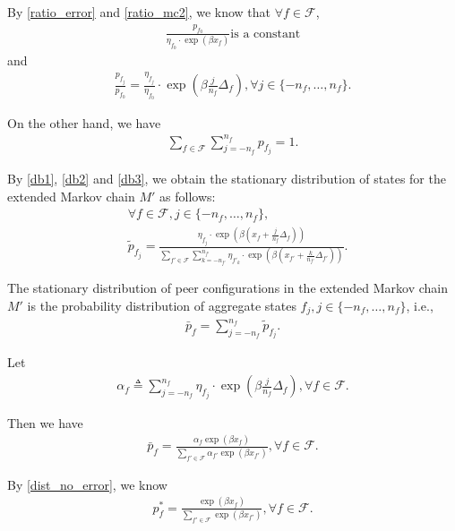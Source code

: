 \documentclass[10pt,conference]{IEEEtran}
\begin{document}
By \eqref{ratio_error} and \eqref{ratio_mc2}, we know that $ \forall
f \in \mathcal{F}$,
\begin{align}
\label{db1} \frac{p_{f_0}}{\eta_{f_0} \cdot \exp(\beta x_f)} \text{
 is a constant}
\end{align}
and
\begin{align}
\label{db2} \frac{p_{f_j}}{p_{f_0}}=\frac{\eta_{f_j}}{\eta_{f_0}}
\cdot \exp(\beta \frac{j}{n_{f}} \Delta_{f}), \forall j \in
\{-n_{f},\ldots,n_{f}\}.
\end{align}

On the other hand, we have
\begin{align}
\label{db3} \sum\limits_{f \in \mathcal{F}} {\sum\limits_{j = - n_f
}^{n_f} {p_{f_j} } }  = 1.
\end{align}

By \eqref{db1}, \eqref{db2} and \eqref{db3}, we obtain the
stationary distribution of states for the extended Markov chain $M'$
as follows:
\begin{align}
& \forall f \in \mathcal{F}, j \in \{-n_{f},\ldots,n_{f}\},\nonumber\\
&\tilde{p}_{f_j}=\frac{\eta_{f_j} \cdot
\exp(\beta(x_f+\frac{j}{n_f}\Delta_f))}{\sum\limits_{f' \in
\mathcal{F}} \sum\limits_{k = - n_{f'} }^{n_{f'}} \eta_{f'_k} \cdot
\exp(\beta(x_{f'}+\frac{k}{n_{f'}}\Delta_{f'}))}.
\end{align}

The stationary distribution of peer configurations in the extended
Markov chain $M'$ is the probability distribution of aggregate
states $f_j, j \in \{-n_{f},\ldots,n_{f}\}$, i.e.,
\begin{align}
\bar{p}_f=\sum\limits_{j = - n_{f} }^{n_{f}} \tilde{p}_{f_j}.
\end{align}

Let \begin{align} \label{aver_coeff} \alpha_f \triangleq
\sum\limits_{j = - n_{f} }^{n_{f}}\eta_{f_j} \cdot
\exp(\beta\frac{j}{n_{f}}\Delta_{f}), \forall f \in \mathcal{F}.
\end{align}

Then we have
\begin{align}
\bar{p}_f=\frac{\alpha_{f}\exp(\beta x_{f})}{\sum\limits_{f' \in
\mathcal{F}} \alpha_{f'}\exp(\beta x_{f'})}, \forall f \in
\mathcal{F}.
\end{align}

By \eqref{dist_no_error}, we know
\begin{align}
p^*_f=\frac{\exp(\beta x_{f})}{\sum\limits_{f' \in \mathcal{F}}
\exp(\beta x_{f'})}, \forall f \in \mathcal{F}.
\end{align}
\end{document}
